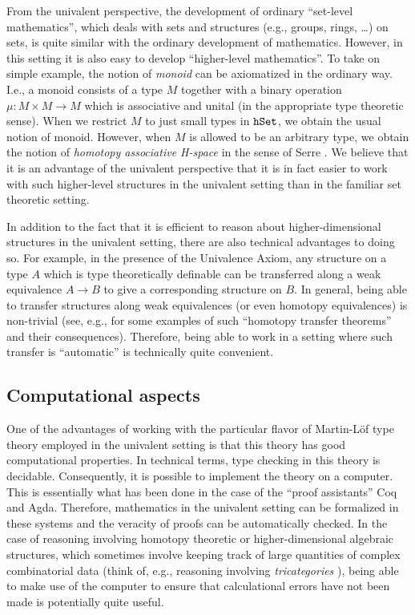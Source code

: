 \documentclass{amsart}
\newcommand{\hset}{\textnormal{\texttt{hSet}}}
\theoremstyle{definition}
\theoremstyle{remark}
\numberwithin{equation}{section}
\begin{document}
From the univalent perspective, the development of ordinary ``set-level
mathematics'', which deals with sets and structures (e.g., groups,
rings, \ldots) on sets, is quite similar with the ordinary development
of mathematics.  However, in this setting it is also easy to develop
``higher-level mathematics''.  To take on simple example, the notion of
\emph{monoid} can be axiomatized in the ordinary way.  I.e., a monoid
consists of a type $M$ together with a binary operation $\mu:M\times
M\to M$ which is associative and unital (in the appropriate type
theoretic sense).  When we restrict $M$ to just
small types in $\hset$, we obtain the usual notion of monoid.
However, when $M$ is allowed to be an arbitrary type, we obtain the
notion of \emph{homotopy associative H-space} in the sense of Serre
\cite{Serre:1951uf}.  We believe that it is an advantage of the
univalent perspective that it is in fact easier to work with such
higher-level structures in the univalent setting than in the familiar
set theoretic setting.

In addition to the fact that it is efficient to reason about
higher-dimensional structures in the univalent setting, there are also
technical advantages to doing so.  For example, in the presence of the
Univalence Axiom, any structure on a type $A$ which is type
theoretically definable can be transferred along a weak equivalence
$A\to B$ to give a corresponding structure on $B$.  In general, being
able to transfer structures along weak equivalences (or even homotopy
equivalences) is non-trivial (see, e.g., \cite{Loday:2012vi} for some
examples of such ``homotopy transfer theorems'' and their
consequences).  Therefore, being able to work in a setting where such
transfer is ``automatic'' is technically quite convenient.

\subsection{Computational aspects}\label{section:computational}

One of the advantages of working with the particular flavor of
Martin-L\"{o}f type theory employed in the univalent setting is that
this theory has good computational properties.  In technical terms,
type checking in this theory is decidable.  Consequently, it is
possible to implement the theory on a computer.  This is essentially
what has been done in the case of the ``proof assistants'' Coq and
Agda. Therefore, mathematics in the univalent setting can be
formalized in these systems and the veracity of proofs can be
automatically checked.  In the case of reasoning involving homotopy
theoretic or higher-dimensional algebraic structures, which sometimes
involve keeping track of large quantities of complex combinatorial
data (think of, e.g., reasoning involving \emph{tricategories}
\cite{Gordon:CT}), being able to make use of the computer to ensure
that calculational errors have not been made is potentially quite
useful.
\end{document}
